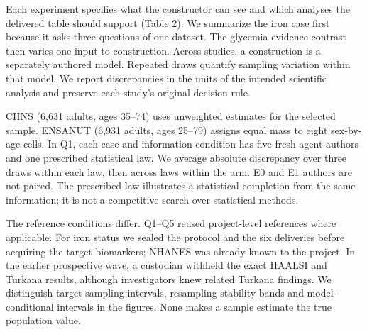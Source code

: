\documentclass[sigconf,review]{acmart}
\begin{document}
Each experiment specifies what the constructor can see and which analyses the delivered table should support (Table 2). We summarize the iron case first because it asks three questions of one dataset. The glycemia evidence contrast then varies one input to construction. Across studies, a construction is a separately authored model. Repeated draws quantify sampling variation within that model. We report discrepancies in the units of the intended scientific analysis and preserve each study's original decision rule.


CHNS (6,631 adults, ages 35–\allowbreak{}74) uses unweighted estimates for the selected sample. ENSANUT (6,931 adults, ages 25–\allowbreak{}79) assigns equal mass to eight sex-by-age cells. In Q1, each case and information condition has five fresh agent authors and one prescribed statistical law. We average absolute discrepancy over three draws within each law, then across laws within the arm. E0 and E1 authors are not paired. The prescribed law illustrates a statistical completion from the same information; it is not a competitive search over statistical methods.


The reference conditions differ. Q1–\allowbreak{}Q5 reused project-level references where applicable. For iron status we sealed the protocol and the six deliveries before acquiring the target biomarkers; NHANES was already known to the project. In the earlier prospective wave, a custodian withheld the exact HAALSI and Turkana results, although investigators knew related Turkana findings. We distinguish target sampling intervals, resampling stability bands and model-conditional intervals in the figures. None makes a sample estimate the true population value.
\end{document}
